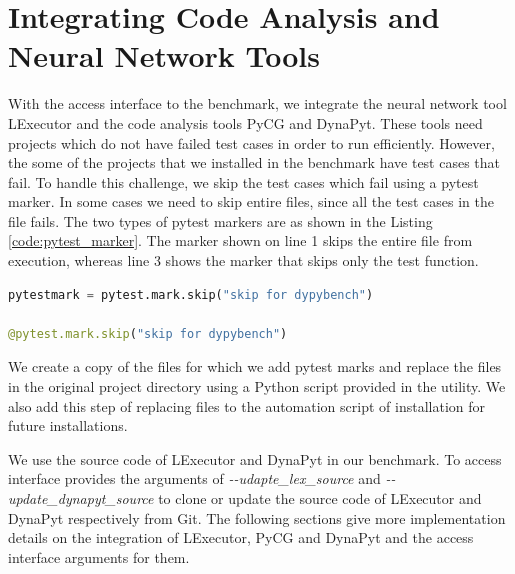 \section{Integrating Code Analysis and Neural Network Tools}
\label{impl:Integrating Tools}
With the access interface to the benchmark, we integrate the neural network tool LExecutor and the code analysis tools PyCG and DynaPyt.
These tools need projects which do not have failed test cases in order to run efficiently.
However, the some of the projects that we installed in the benchmark have test cases that fail.
To handle this challenge, we skip the test cases which fail using a pytest marker.
In some cases we need to skip entire files, since all the test cases in the file fails.
The two types of pytest markers are as shown in the Listing \ref{code:pytest_marker}.
The marker shown on line 1 skips the entire file from execution, whereas line 3 shows the marker that skips only the test function.
\begin{lstlisting}[caption=Skip Test Case using Pytest Marker.,label=code:pytest_marker,language=Python]
pytestmark = pytest.mark.skip("skip for dypybench")

@pytest.mark.skip("skip for dypybench")
\end{lstlisting}

We create a copy of the files for which we add pytest marks and replace the files in the original project directory using a Python script provided in the utility.
We also add this step of replacing files to the automation script of installation for future installations.

We use the source code of LExecutor and DynaPyt in our benchmark.
To access interface provides the arguments of \textit{\--\--udapte\_lex\_source} and \textit{\--\--update\_dynapyt\_source} to clone or update the source code of LExecutor and DynaPyt respectively from Git.
The following sections give more implementation details on the integration of LExecutor, PyCG and DynaPyt and the access interface arguments for them.

